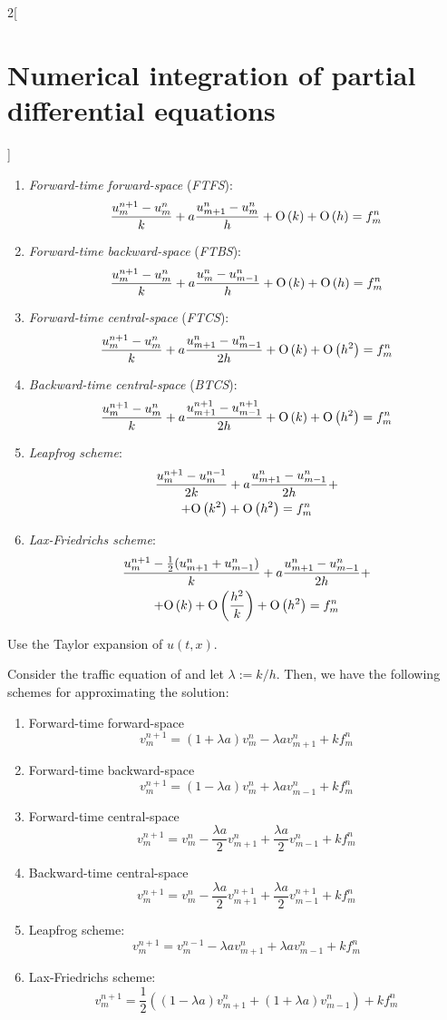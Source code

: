 \documentclass[../../../main_math.tex]{subfiles}
\begin{document}
\begin{multicols}{2}[\section{Numerical integration of partial differential equations}]
\begin{proposition}
\begin{enumerate}
      \item \emph{Forward-time forward-space} (\emph{FTFS}):
            $$\frac{u_m^{n+1}-u_m^n}{k}+a\frac{u_{m+1}^n-u_m^n}{h}+\mathrm{O}\left(k\right)+\mathrm{O}\left(h\right)=f_m^n$$
      \item \emph{Forward-time backward-space} (\emph{FTBS}):
            $$\frac{u_m^{n+1}-u_m^n}{k}+a\frac{u_{m}^n-u_{m-1}^n}{h}+\mathrm{O}\left(k\right)+\mathrm{O}\left(h\right)=f_m^n$$
      \item \emph{Forward-time central-space} (\emph{FTCS}):
            $$\frac{u_m^{n+1}-u_m^n}{k}+a\frac{u_{m+1}^n-u_{m-1}^n}{2h}+\mathrm{O}\left(k\right)+\mathrm{O}\left(h^2\right)=f_m^n$$
      \item \emph{Backward-time central-space} (\emph{BTCS}):
            $$\frac{u_m^{n+1}-u_m^n}{k}+a\frac{u_{m+1}^{n+1}-u_{m-1}^{n+1}}{2h}+\mathrm{O}\left(k\right)+\mathrm{O}\left(h^2\right)=f_m^n$$
      \item \emph{Leapfrog scheme}:
            \begin{multline*}
              \frac{u_m^{n+1}-u_m^{n-1}}{2k}+a\frac{u_{m+1}^n-u_{m-1}^n}{2h}+\\+\mathrm{O}\left(k^2\right)+\mathrm{O}\left(h^2\right)=f_m^n
            \end{multline*}
      \item \emph{Lax-Friedrichs scheme}:
            \begin{multline*}
              \frac{u_m^{n+1}-\frac{1}{2}(u_{m+1}^n+u_{m-1}^n)}{k}+a\frac{u_{m+1}^n-u_{m-1}^n}{2h} + \\ + \mathrm{O}\left(k\right)+\mathrm{O}\left(\frac{h^2}{k}\right)+\mathrm{O}\left(h^2\right)=f_m^n
            \end{multline*}
    \end{enumerate}
  \end{proposition}
  \begin{sproof}
    Use the Taylor expansion of $u(t,x)$.
  \end{sproof}
  \begin{corollary}
    Consider the traffic equation of  and let $\lambda:=k/h$. Then, we have the following schemes for approximating the solution:
    \begin{enumerate}
      \item Forward-time forward-space
            $$\displaystyle v_m^{n+1}=(1+\lambda a)v_m^n-\lambda av_{m+1}^n+kf_m^n$$
      \item Forward-time backward-space
            $$\displaystyle v_m^{n+1}=(1-\lambda a)v_m^n+\lambda av_{m-1}^n+kf_m^n$$
      \item Forward-time central-space
            $$\displaystyle v_m^{n+1}=v_m^n-\frac{\lambda a}{2}v_{m+1}^n+\frac{\lambda a}{2}v_{m-1}^n+kf_m^n$$
      \item Backward-time central-space
            $$
              \displaystyle v_m^{n+1}=v_m^n-\frac{\lambda a}{2}v_{m+1}^{n+1}+\frac{\lambda a}{2}v_{m-1}^{n+1}+kf_m^n
            $$
      \item Leapfrog scheme: $$v_m^{n+1}=v_m^{n-1}-\lambda av_{m+1}^n+\lambda av_{m-1}^n+kf_m^n$$
      \item Lax-Friedrichs scheme: $$v_m^{n+1}=\frac{1}{2}\left((1-\lambda a)v_{m+1}^n+(1+\lambda a)v_{m-1}^n\right)+kf_m^n$$
    \end{enumerate}
  \end{corollary}

\end{multicols}
\end{document}
